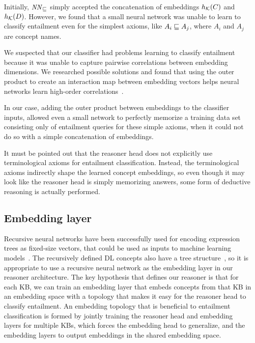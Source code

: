 Initially, $\mathit{NN}_\sqsubseteq$ simply accepted the concatenation of embeddings $h_{\mathcal{K}}(C)$ and $h_{\mathcal{K}}(D)$.
However, we found that a small neural network was unable to learn to classify entailment even for the simplest axioms, like $A_i \sqsubseteq A_j$, where $A_i$ and $A_j$ are concept names.

We suspected that our classifier had problems learning to classify entailment because it was unable to capture pairwise correlations between embedding dimensions.
We researched possible solutions and found that using the outer product to create an interaction map between embedding vectors helps neural networks learn high-order correlations~\cite{he_outer_2018,bednarek_robustness_2020}.

In our case, adding the outer product between embeddings to the classifier inputs, allowed even a small network to perfectly memorize a training data set consisting only of entailment queries for these simple axioms, when it could not do so with a simple concatenation of embeddings.

It must be pointed out that the reasoner head does not explicitly use terminological axioms for entailment classification.
Instead, the terminological axioms indirectly shape the learned concept embeddings, so even though it may look like the reasoner head is simply memorizing answers, some form of deductive reasoning is actually performed.


\subsection{Embedding layer}

Recursive neural networks have been successfully used for encoding expression trees as fixed-size vectors, that could be used as inputs to machine learning models~\cite{goller_learning_1996}.
The recursively defined DL concepts also have a tree structure~\cite{lawrynowicz_discovery_2018}, so it is appropriate to use a recursive neural network as the embedding layer in our reasoner architecture.
The key hypothesis that defines our reasoner is that for each KB, we can train an embedding layer that embeds concepts from that KB in an embedding space with a topology that makes it easy for the reasoner head to classify entailment.
An embedding topology that is beneficial to entailment classification is formed by jointly training the reasoner head and embedding layers for multiple KBs, which forces the embedding head to generalize, and the embedding layers to output embeddings in the shared embedding space.


